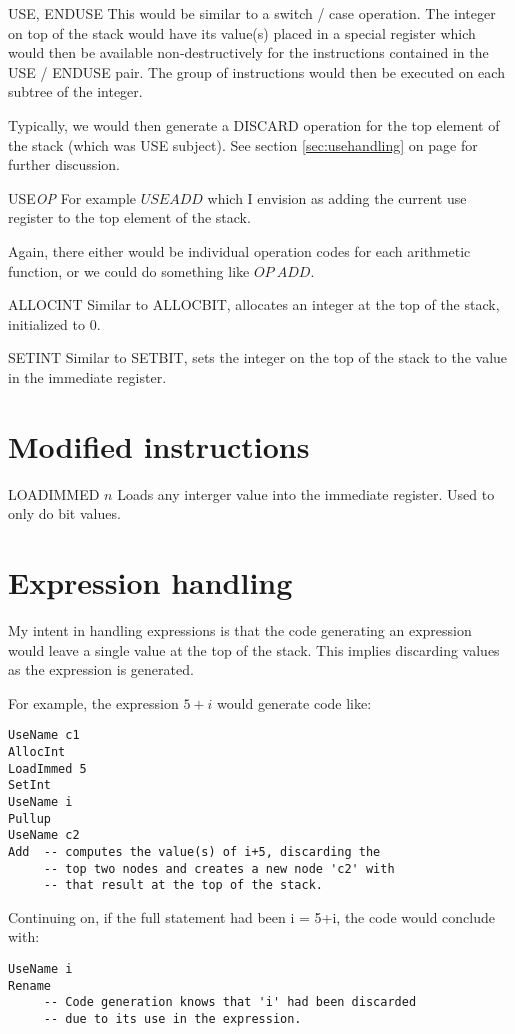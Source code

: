 \documentclass[12pt]{article}
\begin{document}
\begin{description}
\item{USE, ENDUSE}
This would be similar to a switch / case operation. The integer on
top of the stack would have its value(s) placed in a special register
which would then be available non-destructively for the instructions
contained in the USE / ENDUSE pair. The group of instructions would then
be executed on each subtree of the integer. 

Typically, we would then generate a DISCARD operation for the 
top element of the stack (which was USE subject).  See section 
\ref{sec:usehandling} on page \pageref{sec:usehandling} for 
further discussion.

\item{USE\emph{OP}}
For example $USEADD$ which I envision as adding the current use register
to the top element of the
stack.

Again, there either would be individual operation codes for each arithmetic 
function, or we could do something like $OP\ ADD$.
\item{ALLOCINT}
Similar to ALLOCBIT, allocates an integer at the top of the stack, 
initialized to $0$.
\item{SETINT}
Similar to SETBIT, sets the integer on the top of the stack to the value
in the immediate register.

\end{description}
\section{Modified instructions}\label{sec:modifiedinstructions}
\begin{description}
\item{LOADIMMED $n$}
Loads any interger value into the immediate register. Used to only do 
bit values.

\end{description}
\section{Expression handling}\label{sec:expressionhandling}
My intent in handling expressions is that the code generating an expression
would leave a single value at the top of the stack. This implies discarding
values as the expression is generated.

For example, the expression $5+i$ would generate code like:
\begin{verbatim}
UseName c1
AllocInt
LoadImmed 5
SetInt
UseName i
Pullup
UseName c2
Add  -- computes the value(s) of i+5, discarding the 
     -- top two nodes and creates a new node 'c2' with 
     -- that result at the top of the stack. 
\end{verbatim}
Continuing on, if the full statement had been i = 5+i, the code would conclude
with:
\begin{verbatim}
UseName i
Rename
     -- Code generation knows that 'i' had been discarded 
     -- due to its use in the expression.
\end{verbatim}
\end{document}
